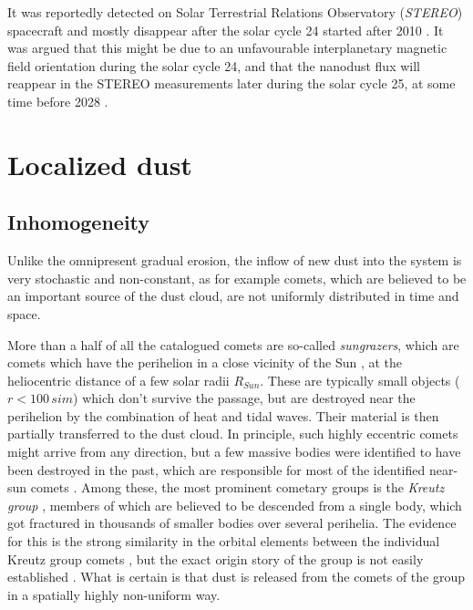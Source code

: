 It was reportedly detected on Solar Terrestrial Relations Observatory (\textit{STEREO}) spacecraft \citep{meyer2009dust} and mostly disappear after the solar cycle 24 started after 2010 \citep{zaslavsky2012interplanetary}. It was argued that this might be due to an unfavourable interplanetary magnetic field orientation during the solar cycle 24, and that the nanodust flux will reappear in the STEREO measurements later during the solar cycle 25, at some time before 2028 \citep{poppe2022effects}.

\section{Localized dust}

\subsection{Inhomogeneity}

Unlike the omnipresent gradual erosion, the inflow of new dust into the system is very stochastic and non-constant, as for example comets, which are believed to be an important source of the dust cloud, are not uniformly distributed in time and space.

More than a half of all the catalogued comets are so-called \textit{sungrazers}, which are comets which have the perihelion in a close vicinity of the Sun \citep{jones2018science}, at the heliocentric distance of a few solar radii $R_{Sun}$. These are typically small objects ($r<100 \, si{m}$) which don't survive the passage, but are destroyed near the perihelion by the combination of heat and tidal waves. Their material is then partially transferred to the dust cloud. In principle, such highly eccentric comets might arrive from any direction, but a few massive bodies were identified to have been destroyed in the past, which are responsible for most of the identified near-sun comets \citep{jones2018science}. Among these, the most prominent cometary groups is the \textit{Kreutz group} \citep{kreutz1888untersuchungen}, members of which are believed to be descended from a single body, which got fractured in thousands of smaller bodies over several perihelia. The evidence for this is the strong similarity in the orbital elements between the individual Kreutz group comets \citep{jones2018science}, but the exact origin story of the group is not easily established \citep{kalinicheva2017specific,fernandez2021origin}. What is certain is that dust is released from the comets of the group in a spatially highly non-uniform way. 

